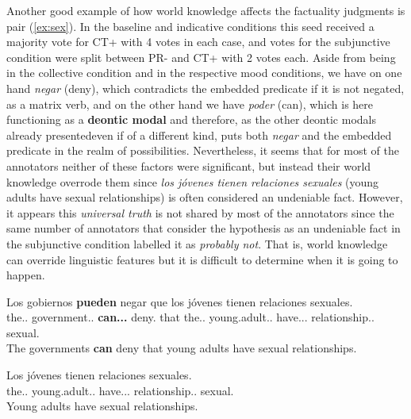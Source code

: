 Another good example of how world knowledge affects the factuality judgments is pair (\ref{ex:sex}). In the baseline and indicative conditions this seed received a majority vote for CT+ with 4 votes in each case, and votes for the subjunctive condition were split between PR- and CT+ with 2 votes each. Aside from being in the collective condition and in the respective mood conditions, we have on one hand \textit{negar} (deny), which contradicts the embedded predicate if it is not negated, as a matrix verb, and on the other hand we have \textit{poder} (can), which is here functioning as a \textbf{deontic modal} and therefore, as the other deontic modals already presentedeven if of a different kind, puts both \textit{negar} and the embedded predicate in the realm of possibilities. Nevertheless, it seems that for most of the annotators neither of these factors were significant, but instead their world knowledge overrode them since \textit{los jóvenes tienen relaciones sexuales} (young adults have sexual relationships) is often considered an undeniable fact. However, it appears this \textit{universal truth} is not shared by most of the annotators since the same number of annotators that consider the hypothesis as an undeniable fact in the subjunctive condition labelled it as \textit{probably not}. That is, world knowledge can override linguistic features but it is difficult to determine when it is going to happen.\\

\begin{exe}
  \ex\label{ex:sex}
    \begin{xlist}
      \item{\gll Los gobiernos \textbf{pueden} negar que los jóvenes tienen relaciones sexuales.\\ the.\M.\Pl{} government.\M.\Pl{} \textbf{can.\Prs.\Ind.\Tpl{}} deny.\Inf{} that the.\M.\Pl{} young.adult.\M.\Pl{} have.\Prs.\Ind.\Tpl{} relationship.\F.\Pl{} sexual.\Pl{} \\\glt The governments \textbf{can} deny that young adults have sexual relationships.}
      \item{\gll Los jóvenes tienen relaciones sexuales.\\ the.\M.\Pl{} young.adult.\M.\Pl{} have.\Prs.\Ind.\Tpl{} relationship.\F.\Pl{} sexual.\Pl{} \\\glt Young adults have sexual relationships.} \label{ex:hypsex}
    \end{xlist}
\end{exe}

